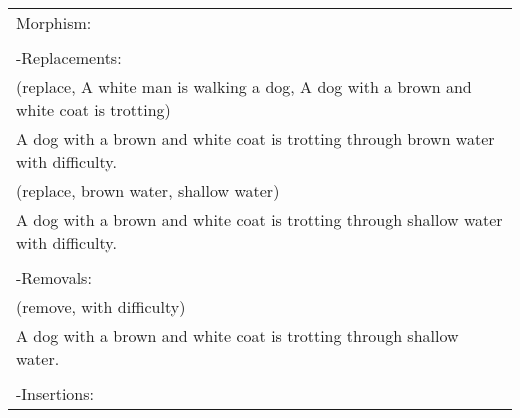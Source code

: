 \begin{tabular}{p{8cm}}
\hline

Morphism:\\\\

-Replacements:\\
(replace, A white man is walking a dog, A dog with a brown and white coat is trotting) \\
A dog with a brown and white coat is trotting through brown water with difficulty.\\ 
(replace, brown water, shallow water)\\
A dog with a brown and white coat is trotting through shallow water with difficulty.\\ \\
-Removals:\\
(remove, with difficulty)\\
A dog with a brown and white coat is trotting through shallow water.\\ \\
-Insertions:\\

\hline
\end{tabular}
